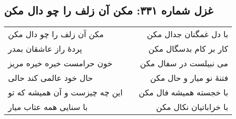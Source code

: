\begin{center}
\section*{غزل شماره ۳۳۱: مکن آن زلف را چو دال مکن}
\label{sec:331}
\begin{longtable}{l p{0.5cm} r}
مکن آن زلف را چو دال مکن
&&
با دل غمگنان جدال مکن
\\
پردهٔ راز عاشقان بمدر
&&
کار بر کام بدسگال مکن
\\
خون حرامست خیره خیره مریز
&&
می نبیلست در سفال مکن
\\
حال خود عالمی کند حالی
&&
فتنهٔ نو میار و حال مکن
\\
این چه چیزست و آن همیشه که تو
&&
با خجسته همیشه فال مکن
\\
با سنایی همه عتاب میار
&&
با خراباتیان نکال مکن
\\
\end{longtable}
\end{center}
